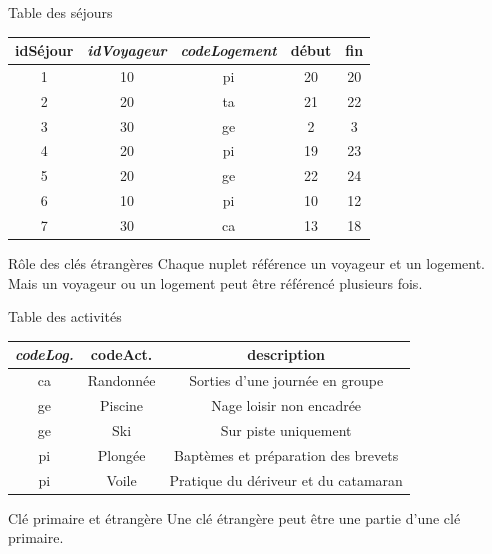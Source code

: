 \begin{frame}[fragile]{Table des séjours}

\begin{center}
\begin{tabular}{c|c|c|c|c}
\textbf{idSéjour} & \textbf{\textit{idVoyageur}} & \textbf{\textit{codeLogement}} & \textbf{début} & \textbf{fin}\\ \hline 
1 & 10 & pi & 20 & 20\\ \hline 
2 & 20 & ta & 21 & 22\\ \hline 
3 & 30 & ge & 2 & 3\\ \hline 
4 & 20 & pi & 19 & 23\\ \hline 
5 & 20 & ge & 22 & 24\\ \hline 
6 & 10 & pi & 10 & 12\\ \hline 
7 & 30 & ca & 13 & 18\\ \hline 
\end{tabular}
\end{center}

\vfill

\begin{remblock}{Rôle des clés étrangères}
Chaque nuplet référence \alert{un} voyageur et \alert{un} logement.
Mais un voyageur ou un logement peut être
référencé plusieurs fois.
\end{remblock}
\end{frame}



\begin{frame}[fragile]{Table des activités}
\begin{center}
\begin{tabular}{c|c|c}
\textbf{\textit{codeLog.}} & \textbf{codeAct.} & \textbf{description}\\ \hline 
ca & Randonnée & Sorties d’une journée en groupe\\ \hline 
ge & Piscine & Nage loisir non encadrée\\ \hline 
ge & Ski & Sur piste uniquement\\ \hline 
pi & Plongée & Baptèmes et préparation des brevets\\ \hline 
pi & Voile & Pratique du dériveur et du catamaran\\ \hline 
\end{tabular}
\end{center}


\vfill

\begin{remblock}{Clé primaire et étrangère }
Une clé étrangère peut être une partie d'une clé primaire.
\end{remblock}
\end{frame}

